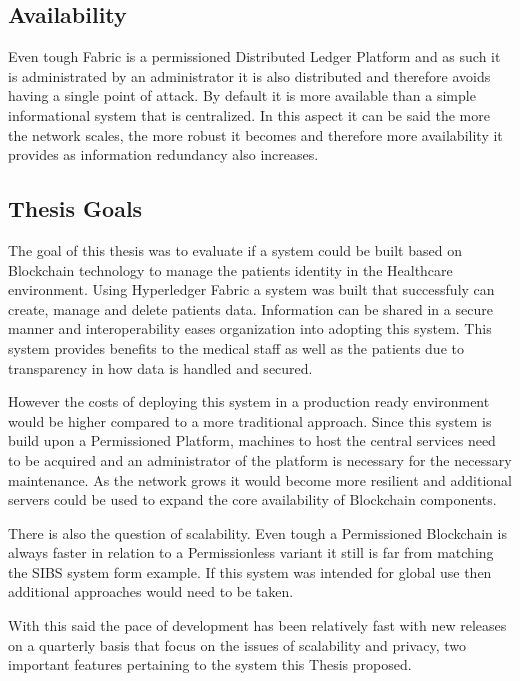 \subsection{Availability}

Even tough Fabric is a permissioned Distributed Ledger Platform and as such it
is administrated by an administrator it is also distributed and therefore
avoids having a single point of attack. By default it is more available than a
simple informational system that is centralized. In this aspect it can be said
the more the network scales, the more robust it becomes and therefore more
availability it provides as information redundancy also increases.

\subsection{Thesis Goals}

The goal of this thesis was to evaluate if a system could be built based on
Blockchain technology to manage the patients identity in the Healthcare
environment. Using Hyperledger Fabric a system was built that successfuly can
create, manage and delete patients data. Information can be shared in a secure
manner and interoperability eases organization into adopting this system. This
system provides benefits to the medical staff as well as the patients due to
transparency in how data is handled and secured.

However the costs of deploying this system in a production ready environment
would be higher compared to a more traditional approach. Since this system is
build upon a Permissioned Platform, machines to host the central services need
to be acquired and an administrator of the platform is necessary for the
necessary maintenance. As the network grows it would become more resilient and
additional servers could be used to expand the core availability of Blockchain
components.

There is also the question of scalability. Even tough a Permissioned Blockchain
is always faster in relation to a Permissionless variant it still is far from
matching the SIBS system form example. If this system was intended for global
use then additional approaches would need to be taken.

With this said the pace of development has been relatively fast with new
releases on a quarterly basis that focus on the issues of scalability and
privacy, two important features pertaining to the system this Thesis proposed.
